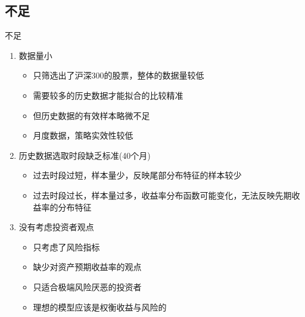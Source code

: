 \documentclass[CJK,aspectratio=43]{beamer}  %
\begin{document}
\subsection{不足}
\begin{frame}{不足}
	\begin{enumerate}
		\item 数据量小
		\begin{itemize}
			\item 只筛选出了沪深300的股票，整体的数据量较低
			\item 需要较多的历史数据才能拟合的比较精准
			\item 但历史数据的有效样本略微不足
			\item 月度数据，策略实效性较低
		\end{itemize}
			\item  历史数据选取时段缺乏标准(40个月)
		\begin{itemize}
			\item 过去时段过短，样本量少，反映尾部分布特征的样本较少
			\item 过去时段过长，样本量过多，收益率分布函数可能变化，无法反映先期收益率的分布特征
		\end{itemize}
		\item  没有考虑投资者观点
		\begin{itemize}
			\item 只考虑了风险指标
			\item 缺少对资产预期收益率的观点
			\item 只适合极端风险厌恶的投资者
			\item 理想的模型应该是权衡收益与风险的
		\end{itemize}
	\end{enumerate}
\end{frame}
\end{document}
